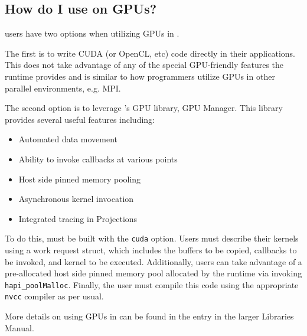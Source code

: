 \subsection{How do I use \charm{} on GPUs?}
\charm{} users have two options when utilizing GPUs in \charm.

The first is to write CUDA (or OpenCL, etc) code directly in their \charm{}
applications. This does not take advantage of any of the special GPU-friendly
features the \charm{} runtime provides and is similar to how programmers utilize
GPUs in other parallel environments, e.g. MPI.

The second option is to leverage \charm's GPU library, GPU Manager. This library
provides several useful features including:
\begin{itemize}
\item Automated data movement
\item Ability to invoke callbacks at various points
\item Host side pinned memory pooling
\item Asynchronous kernel invocation
\item Integrated tracing in Projections
\end{itemize}

To do this, \charm{} must be built with the \texttt{cuda} option. Users must
describe their kernels using a work request struct, which includes the buffers
to be copied, callbacks to be invoked, and kernel to be executed. Additionally,
users can take advantage of a pre-allocated host side pinned memory pool
allocated by the runtime via invoking \texttt{hapi\_poolMalloc}. Finally, the
user must compile this code using the appropriate \texttt{nvcc} compiler as per
usual.

More details on using GPUs in \charm{} can be found in the
entry in the larger Libraries Manual.


